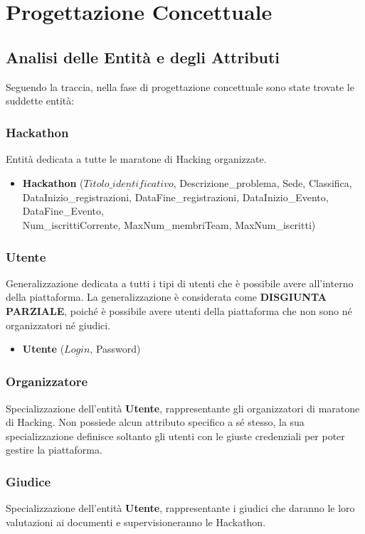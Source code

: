 \documentclass[a4paper, 10pt]{article}
\begin{document}
	\section{Progettazione Concettuale}
	\subsection{Analisi delle Entità e degli Attributi}
	Seguendo la traccia, nella fase di progettazione concettuale sono state trovate le suddette entità:
	\subsubsection{Hackathon}
	Entità dedicata a tutte le maratone di Hacking organizzate.
	\begin{itemize}
		\item \textbf{Hackathon} ($\underline{Titolo\_identificativo}$, Descrizione\_problema, Sede, Classifica,\\ DataInizio\_registrazioni, DataFine\_registrazioni, DataInizio\_Evento, DataFine\_Evento, \\Num\_iscrittiCorrente, MaxNum\_membriTeam, MaxNum\_iscritti)
	\end{itemize}
	\subsubsection{Utente}
	Generalizzazione dedicata a tutti i tipi di utenti che è possibile avere all'interno della piattaforma.
	La generalizzazione è considerata come \textbf{DISGIUNTA PARZIALE}, poiché è possibile avere utenti della piattaforma che non sono né organizzatori né giudici.
	\begin{itemize}
		\item \textbf{Utente} ($\underline{Login}$, Password)
	\end{itemize}
	\subsubsection{Organizzatore}
	Specializzazione dell'entità \textbf{Utente}, rappresentante gli organizzatori di maratone di Hacking.
	Non possiede alcun attributo specifico a sé stesso, la sua specializzazione definisce soltanto gli utenti con le giuste credenziali per poter gestire la piattaforma.
	\subsubsection{Giudice}
	Specializzazione dell'entità \textbf{Utente}, rappresentante i giudici che daranno le loro valutazioni ai documenti e supervisioneranno le Hackathon.
\end{document}
